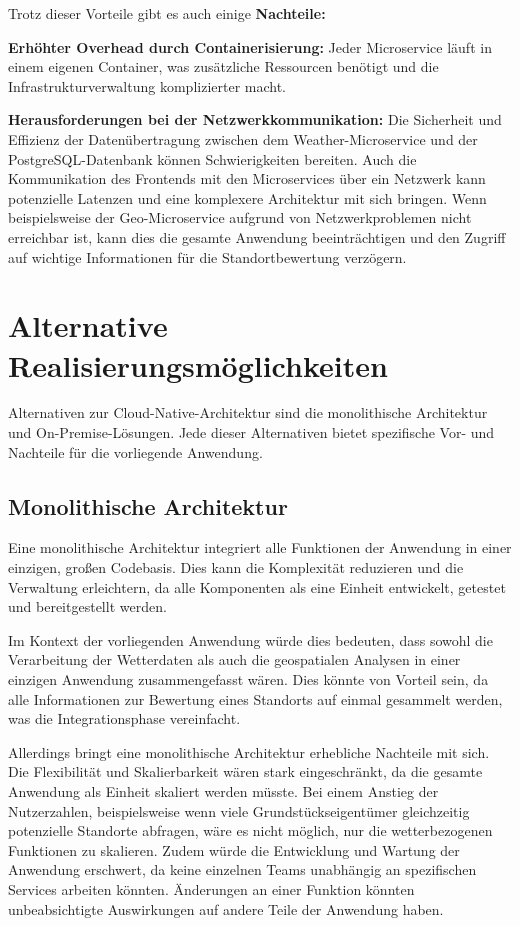 Trotz dieser Vorteile gibt es auch einige \textbf{Nachteile:}

\textbf{Erhöhter Overhead durch Containerisierung:} Jeder Microservice läuft in einem eigenen Container, was zusätzliche Ressourcen benötigt und die Infrastrukturverwaltung komplizierter macht.

\textbf{Herausforderungen bei der Netzwerkkommunikation:} Die Sicherheit und Effizienz der Datenübertragung zwischen dem Weather-Microservice und der PostgreSQL-Datenbank können Schwierigkeiten bereiten. Auch die Kommunikation des Frontends mit den Microservices über ein Netzwerk kann potenzielle Latenzen und eine komplexere Architektur mit sich bringen. Wenn beispielsweise der Geo-Microservice aufgrund von Netzwerkproblemen nicht erreichbar ist, kann dies die gesamte Anwendung beeinträchtigen und den Zugriff auf wichtige Informationen für die Standortbewertung verzögern.

\section{Alternative Realisierungsmöglichkeiten}

Alternativen zur Cloud-Native-Architektur sind die monolithische Architektur und On-Premise-Lösungen. Jede dieser Alternativen bietet spezifische Vor- und Nachteile für die vorliegende Anwendung.

\subsection{Monolithische Architektur}

Eine monolithische Architektur integriert alle Funktionen der Anwendung in einer einzigen, großen Codebasis. Dies kann die Komplexität reduzieren und die Verwaltung erleichtern, da alle Komponenten als eine Einheit entwickelt, getestet und bereitgestellt werden.

Im Kontext der vorliegenden Anwendung würde dies bedeuten, dass sowohl die Verarbeitung der Wetterdaten als auch die geospatialen Analysen in einer einzigen Anwendung zusammengefasst wären. Dies könnte von Vorteil sein, da alle Informationen zur Bewertung eines Standorts auf einmal gesammelt werden, was die Integrationsphase vereinfacht.

Allerdings bringt eine monolithische Architektur erhebliche Nachteile mit sich. Die Flexibilität und Skalierbarkeit wären stark eingeschränkt, da die gesamte Anwendung als Einheit skaliert werden müsste. Bei einem Anstieg der Nutzerzahlen, beispielsweise wenn viele Grundstückseigentümer gleichzeitig potenzielle Standorte abfragen, wäre es nicht möglich, nur die wetterbezogenen Funktionen zu skalieren. Zudem würde die Entwicklung und Wartung der Anwendung erschwert, da keine einzelnen Teams unabhängig an spezifischen Services arbeiten könnten. Änderungen an einer Funktion könnten unbeabsichtigte Auswirkungen auf andere Teile der Anwendung haben.

